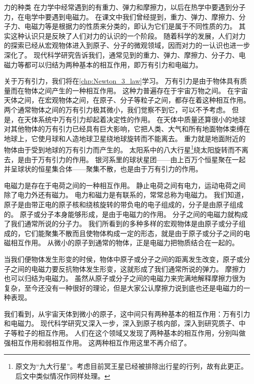 \begin{Reading}{力的种类}
在力学中经常遇到的有重力、弹力和摩擦力，以后在热学中要遇到分子力，在电学中要遇到电磁力。
在课文中我们曾经提到，重力、弹力、摩擦力、分子力、电磁力等是根据力的性质来分类的，即认为它们是属于不同性质的力。
其实这种认识只是反映了人们对力的认识的一个阶段。
随着科学的发展，人们对力的探索已经从宏观物体进入到原子、分子的微观领域，因而对力的一认识也进一步深化了。
现代科学研究告诉我们，通常见到的重力、弹力、摩擦力、分子力、电磁力等都可以归结为两种基本的相互作用，即万有引力和电磁力。

关于万有引力，我们将在\cref{chp:Newton_3_law}学习。
万有引力是由于物体具有质量而在物体之间产生的一种相互作用。
这种力普遍存在于宇宙万物之间。
在宇宙天体之间，在宏观物体之间，在原子、分子等粒子之间，都存在着这种相互作用。
两个通常物体之间的万有引力极其微小，我们觉察不到它，可以不予考虑。
但是，在天体系统中万有引力却起着决定性的作用。
在天体中质量还算很小的地球对其他物体的万有引力已经具有巨大影响，它把人类、大气和所有地面物体束缚在地球上，它使月球和人造地球卫星绕地球旋转而不能离去。
重力就是地面附近的物体由于受到地球的万有引力而产生的。
太阳系中的八大行星\footnote{原文为“九大行星”。考虑目前冥王星已经被排除出行星的行列，故有此更正。后文中类似情况作同样处理。}绕太阳旋转而不离去，是由于万有引力的作用。
银河系里的球状星团——由上百万个恒星聚在一起并呈球状的恒星集合体——聚集不散，也是由于万有引力的作用。

电磁力是存在于电荷之间的一种相互作用。
静止电荷之间有电力，运动电荷之间除了电力外还有磁力。
电力和磁力是有联系的，常常总称为电磁力。
我们知道，原子是由带正电的原子核和绕核旋转的带负电的电子组成的，分子是由原子组成的。
原子或分子本身能够形成，是由于电磁力的作用。
分子之间的电磁力就构成了我们通常所说的分子力。
我们所看到的多种多样的宏观物体是由原子或分子组成的，它们能聚集不散而且使物体构成一定的形态，就是由于原子或分子之间的电磁相互作用。
从微小的原子到通常的物体，正是电磁力把物质结合在一起的。

当我们便物体发生形变的时侯，物体中原子或分子之间的距离发生改变，原子或分子之间的电磁力要反抗物体发生形变，这就形成了我们通常所说的弹力。
摩擦力也可以归结为电磁力。
虽然从原子或分子之间的电磁力来完满地解释摩擦力很为复杂，至今还没有一种很好的理论，但是大家公认摩擦力说到底也还是电磁力的一种表现。

我们看到，从宇宙天体到微小的原子，这中间只有两种基本的相互作用：万有引力和电磁力。
现代科学研究又深入一步，深入到原子核内部，深入到研究质子、中子等粒子的相互作用。
人们在这个领域又发现了两种基本的相互作用，分别叫做强相互作用和弱相互作用。
这两种相互作用这里不再介绍了。


\end{Reading}
